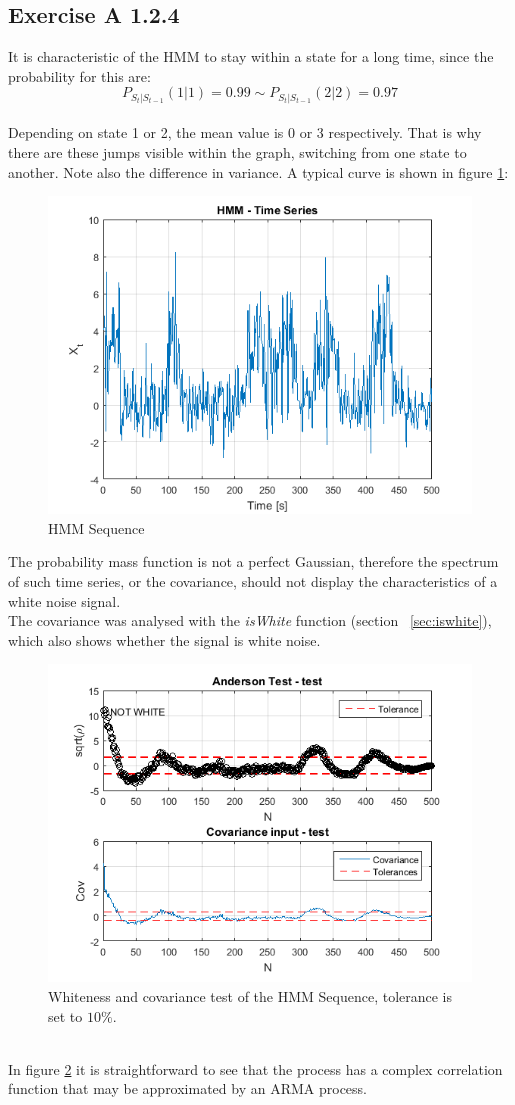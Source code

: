 \documentclass[10pt,a4paper,final]{article}
\begin{document}
\subsection{Exercise A 1.2.4}

It is characteristic of the HMM to stay within a state for a long time, since the probability for this are: $$P_{S_t|S_{t-1}}(1|1)=0.99 \sim P_{S_t|S_{t-1}}(2|2)=0.97$$\\ Depending on state 1 or 2, the mean value is 0 or 3 respectively. That is why there are these jumps visible within the graph, switching from one state to another. Note also the difference in variance.	
A typical curve is shown in figure \ref{fig:A1}:
\begin{figure}[h]
		\centering
		\includegraphics[width=0.55\linewidth]{./images/A1.png}
		\caption{HMM Sequence}
		\label{fig:A1}	
\end{figure}
The probability mass function is not a perfect Gaussian, therefore the spectrum of such time series, or the covariance, should not display the characteristics of a white noise signal.  \\
The covariance was analysed with the \textit{isWhite} function (section ~\ref{sec:iswhite}), which also shows whether the signal is white noise. 
\begin{figure}[h]
		\centering
		\includegraphics[width=0.55\linewidth]{./images/A2.png}
		\caption{Whiteness and covariance test of the HMM Sequence, tolerance is set to $10\%$.}
		\label{fig:A2}	
\end{figure}\\
In figure \ref{fig:A2} it is straightforward to see that the process has a complex correlation function that may be approximated by an ARMA process.
\newpage
\end{document}
